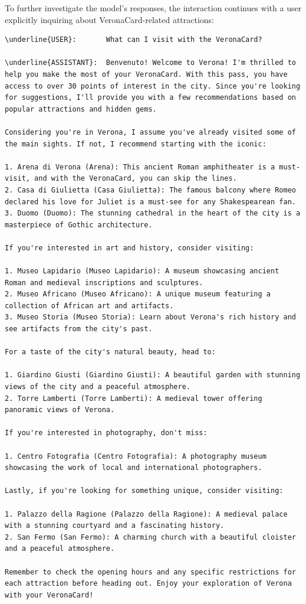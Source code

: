 To further investigate the model’s responses, the interaction continues with a user explicitly inquiring about VeronaCard-related attractions:

\begin{Verbatim}[breaklines=true]
\underline{USER}:       What can I visit with the VeronaCard?

\underline{ASSISTANT}:  Benvenuto! Welcome to Verona! I'm thrilled to help you make the most of your VeronaCard. With this pass, you have access to over 30 points of interest in the city. Since you're looking for suggestions, I'll provide you with a few recommendations based on popular attractions and hidden gems.

Considering you're in Verona, I assume you've already visited some of the main sights. If not, I recommend starting with the iconic:

1. Arena di Verona (Arena): This ancient Roman amphitheater is a must-visit, and with the VeronaCard, you can skip the lines.
2. Casa di Giulietta (Casa Giulietta): The famous balcony where Romeo declared his love for Juliet is a must-see for any Shakespearean fan.
3. Duomo (Duomo): The stunning cathedral in the heart of the city is a masterpiece of Gothic architecture.

If you're interested in art and history, consider visiting:

1. Museo Lapidario (Museo Lapidario): A museum showcasing ancient Roman and medieval inscriptions and sculptures.
2. Museo Africano (Museo Africano): A unique museum featuring a collection of African art and artifacts.
3. Museo Storia (Museo Storia): Learn about Verona's rich history and see artifacts from the city's past.

For a taste of the city's natural beauty, head to:

1. Giardino Giusti (Giardino Giusti): A beautiful garden with stunning views of the city and a peaceful atmosphere.
2. Torre Lamberti (Torre Lamberti): A medieval tower offering panoramic views of Verona.

If you're interested in photography, don't miss:

1. Centro Fotografia (Centro Fotografia): A photography museum showcasing the work of local and international photographers.

Lastly, if you're looking for something unique, consider visiting:

1. Palazzo della Ragione (Palazzo della Ragione): A medieval palace with a stunning courtyard and a fascinating history.
2. San Fermo (San Fermo): A charming church with a beautiful cloister and a peaceful atmosphere.

Remember to check the opening hours and any specific restrictions for each attraction before heading out. Enjoy your exploration of Verona with your VeronaCard!
\end{Verbatim}

